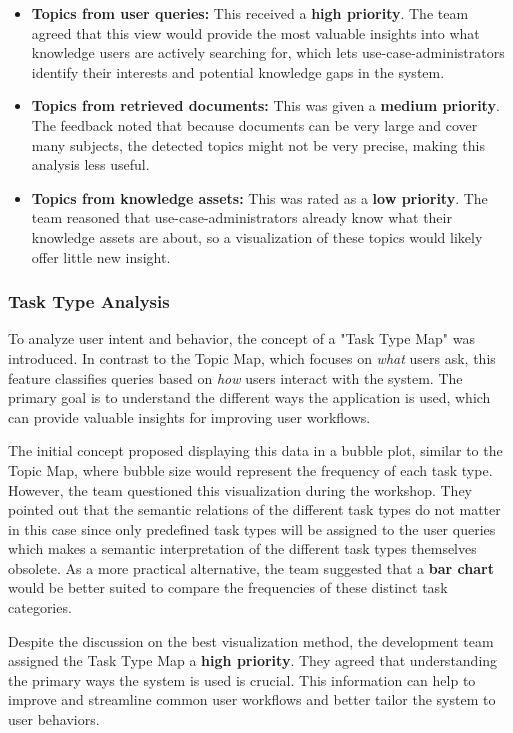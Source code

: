 \documentclass[
	english,
	ruledheaders=section,%
	class=report,%
	thesis={type=bachelor},%
	accentcolor=1b,%
	custommargins=true,%
	marginpar=false,%
	parskip=half-,%
	fontsize=11pt,%
	DIV=14,
]{tudapub}
\begin{document}
\begin{itemize}
    \item \textbf{Topics from user queries:} This received a \textbf{high priority}. The team agreed that this view would provide the most valuable insights into what knowledge users are actively searching for, which lets use-case-administrators identify their interests and potential knowledge gaps in the system.
    
    \item \textbf{Topics from retrieved documents:} This was given a \textbf{medium priority}. The feedback noted that because documents can be very large and cover many subjects, the detected topics might not be very precise, making this analysis less useful.
    
    \item \textbf{Topics from knowledge assets:} This was rated as a \textbf{low priority}. The team reasoned that use-case-administrators already know what their knowledge assets are about, so a visualization of these topics would likely offer little new insight.
\end{itemize}
\subsubsection{Task Type Analysis}
To analyze user intent and behavior, the concept of a "Task Type Map" was introduced. In contrast to the Topic Map, which focuses on \textit{what} users ask, this feature classifies queries based on \textit{how} users interact with the system. The primary goal is to understand the different ways the application is used, which can provide valuable insights for improving user workflows.

The initial concept proposed displaying this data in a bubble plot, similar to the Topic Map, where bubble size would represent the frequency of each task type. However, the team questioned this visualization during the workshop. They pointed out that the semantic relations of the different task types do not matter in this case since only predefined task types will be assigned to the user queries which makes a semantic interpretation of the different task types themselves obsolete. As a more practical alternative, the team suggested that a \textbf{bar chart} would be better suited to compare the frequencies of these distinct task categories.

Despite the discussion on the best visualization method, the development team assigned the Task Type Map a \textbf{high priority}. They agreed that understanding the primary ways the system is used is crucial. This information can help to improve and streamline common user workflows and better tailor the system to user behaviors.
\end{document}
